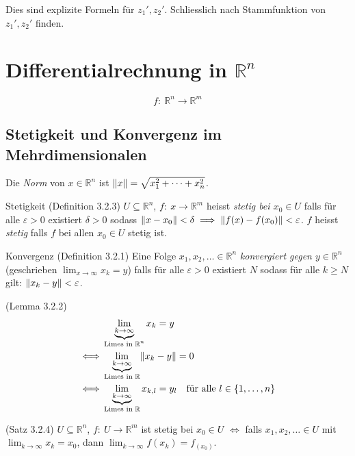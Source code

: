 \documentclass[a4paper,10pt]{article}
\def\limxi{\lim_{x\to\infty}}
\def\R{\mathbb{R}}
\DeclarePairedDelimiter\norm{\lVert}{\rVert}
\begin{document}
Dies sind explizite Formeln für \( z_1', z_2' \). Schliesslich nach Stammfunktion von \( z_1', z_2' \) finden.


\section{Differentialrechnung in \(\R^n\)}

\[ f: \: \R^n \to \R^m \]


\subsection{Stetigkeit und Konvergenz im Mehrdimensionalen}

Die \emph{Norm} von \( x \in \R^n \) ist \( \norm{x} = \sqrt{x_1^2 + \dots + x_n^2} \).

\begin{mainbox}{Stetigkeit (Definition 3.2.3)}
    \( U \subseteq \R^n \), \( f: \: x \to \R^m \) heisst \emph{stetig bei \( x_0 \in U \)} falls für alle \( \varepsilon > 0 \) existiert \( \delta > 0 \) sodass \( \norm{x - x_0} < \delta \implies \norm{f(x) - f(x_0)} < \varepsilon \). \( f \) heisst \emph{stetig} falls \( f \) bei allen \( x_0 \in U \) stetig ist.
\end{mainbox}

\begin{mainbox}{Konvergenz (Definition 3.2.1)}
    Eine Folge \( x_1, x_2, \dots \in \R^n \) \emph{konvergiert gegen \( y \in \R^n \)} (geschrieben \( \limxi x_k = y \)) falls für  alle \( \varepsilon > 0 \) existiert \( N \) sodass für alle \( k \geq N \) gilt: \( \norm{x_k - y} < \varepsilon \).
\end{mainbox}

\begin{subbox}{(Lemma 3.2.2)}
    \begin{align*}
        & \underbrace{\lim_{k \to \infty}}_\text{Limes in \( \R^n \)} x_k = y \\
        \iff & \underbrace{\lim_{k \to \infty}}_\text{Limes in \( \R \)} \norm{x_k - y} = 0 \\
        \iff & \underbrace{\lim_{k \to \infty}}_\text{Limes in \( \R \)} x_{k, l} = y_l \quad \text{für alle \( l \in \{ 1, \dots, n \} \)}
    \end{align*}
\end{subbox}

\begin{subbox}{(Satz 3.2.4)}
    \( U \subseteq \R^n \), \( f: \: U \to \R^m \) ist stetig bei \( x_0 \in U \) \( \iff \) falls \( x_1, x_2, \dots \in U \) mit \( \lim_{k \to \infty} x_k = x_0 \), dann \( \lim_{k \to \infty} f(x_k) = f_(x_0) \).
\end{subbox}
\end{document}
